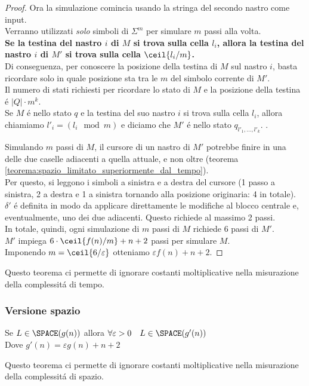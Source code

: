 \begin{proof}
Ora la simulazione comincia usando la stringa del secondo nastro come input. \\
Verranno utilizzati \textit{solo} simboli di $\Sigma^m$ per simulare $m$ passi alla volta. \\

\textbf{Se la testina del nastro $i$ di $M$ si trova sulla cella $l_i$, allora la testina del nastro $i$ di $M'$ si trova sulla cella $\ceil{l_i/m}$.} \\
Di conseguenza, per conoscere la posizione della testina di $M$ sul nastro $i$, basta ricordare solo in quale posizione sta tra le $m$ del simbolo corrente di $M'$. \\
Il numero di stati richiesti per ricordare lo stato di $M$ e la posizione della testina é $|Q| \cdot m^k$. \\

Se $M$ é nello stato $q$ e la testina del suo nastro $i$ si trova sulla cella $l_i$, allora chiamiamo ${l'}_i = (l_i \mod m)$ e diciamo che $M'$ é nello stato $q_{l'_1, \ldots, l'_k}$. .

Simulando $m$ passi di $M$, il cursore di un nastro di $M'$ potrebbe finire in una delle due caselle adiacenti a quella attuale, e non oltre (teorema \ref{teorema:spazio_limitato_superiormente_dal_tempo}).\\
Per questo, si leggono i simboli a sinistra e a destra del cursore (1 passo a sinistra, 2 a destra e 1 a sinistra tornando alla posizione originaria: 4 in totale). \\
$\delta'$ é definita in modo da applicare direttamente le modifiche al blocco centrale e, eventualmente, uno dei due adiacenti. Questo richiede al massimo 2 passi. \\

In totale, quindi, ogni simulazione di $m$ passi di $M$ richiede $6$ passi di $M'$. \\
$M'$ impiega $6 \cdot \ceil{f(n)/m} + n + 2$ passi per simulare $M$. \\
Imponendo $m = \ceil{6/\varepsilon}$ otteniamo $\varepsilon f(n) + n + 2$.
\end{proof}

Questo teorema ci permette di ignorare costanti moltiplicative nella misurazione della complessitá di tempo.

\subsubsection{Versione spazio}
Se $L \in \SPACE(g(n))$ allora $\forall \varepsilon > 0 \quad L \in \SPACE(g'(n))$ \\
Dove $g'(n) = \varepsilon g(n) + n + 2$

Questo teorema ci permette di ignorare costanti moltiplicative nella misurazione della complessitá di spazio.
